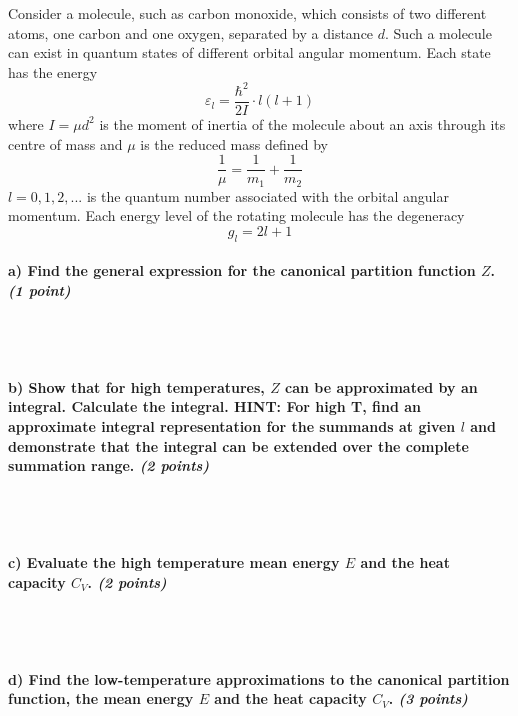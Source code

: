 Consider a molecule, such as carbon monoxide, which consists of two 
different atoms, one carbon and one oxygen, separated by a distance $d$. 
Such a molecule can exist in quantum states of different orbital angular 
momentum. Each state has the energy
\begin{equation}
    \varepsilon_l=\frac{\hbar^2}{2I}\cdot l(l+1)
\end{equation}
where $I=\mu d^2$ is the moment of inertia of the molecule about an axis 
through its centre of mass and $\mu$ is the reduced mass defined by 
\begin{equation}
    \frac{1}{\mu}=\frac{1}{m_1}+\frac{1}{m_2}
\end{equation}
$l=0,1,2,...$ is the quantum number associated with the orbital angular 
momentum. Each energy level of the rotating molecule has the degeneracy
\begin{equation}
    g_l=2l+1
\end{equation}

\paragraph{a) Find the general expression for the canonical partition 
    function $Z$. \textit{(1 point)}
} \ \\
\\

\paragraph{b) Show that for high temperatures, $Z$ can be approximated 
    by an integral. Calculate the integral. HINT: For high T, find an 
    approximate integral representation for the summands at given $l$ and
    demonstrate that the integral can be extended over the complete 
    summation range. \textit{(2 points)}
} \ \\
\\

\paragraph{c) Evaluate the high temperature mean energy $E$ and the heat 
    capacity $C_V$. \textit{(2 points)}
} \ \\
\\

\paragraph{d) Find the low-temperature approximations to the canonical 
    partition function, the mean energy $E$ and the heat capacity $C_V$.
    \textit{(3 points)}
} \ \\
\\
